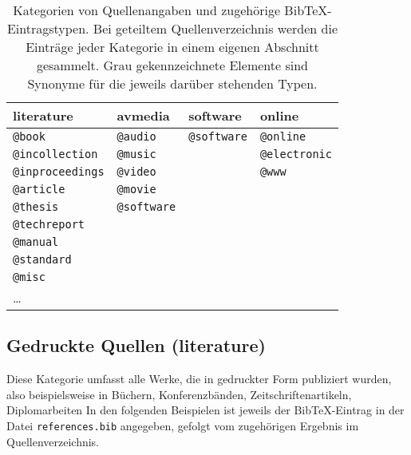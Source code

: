 \begin{table}
\caption{Kategorien von Quellenangaben und zugehörige BibTeX-Eintragstypen.
Bei geteiltem Quellenverzeichnis werden die Einträge jeder Kategorie in einem
eigenen Abschnitt gesammelt.
Grau gekennzeichnete Elemente sind Synonyme für die jeweils darüber stehenden Typen.}
\label{tab:BibKategorien}
\centering
{}
\setlength{\tabcolsep}{4mm}
\begin{tabular}{llll}
	\textsf{literature} & \textsf{avmedia} & \textsf{software} & \textsf{online} \\
	\hline
	\texttt{@book}          & \texttt{@audio}                & \texttt{@software} & \texttt{@online} \\
	\texttt{@incollection}  & \texttt{\color{midgray}@music} & & \texttt{\color{midgray}@electronic} \\
	\texttt{@inproceedings} & \texttt{@video}                & & \texttt{\color{midgray}@www} \\
	\texttt{@article}       & \texttt{@movie}                & &  \\
	\texttt{@thesis}        & \texttt{@software}             & &  \\
	\texttt{@techreport}    &  & &  \\
	\texttt{@manual}        &  & &  \\
	\texttt{@standard}        &  & &  \\
	\texttt{@misc}          &  & &  \\
	\ldots                  &  & &  \\
	\hline
\end{tabular}
\end{table}


\subsection{Gedruckte Quellen (\textsf{literature})}
\label{sec:KategorieLiterature}

Diese Kategorie umfasst alle Werke, die in gedruckter Form publiziert wurden,
also beispielsweise in Büchern, Konferenzbänden, Zeitschriftenartikeln, Diplomarbeiten \usw
In den folgenden Beispielen ist jeweils der BibTeX-Eintrag in der Datei \nolinkurl{references.bib}
angegeben, gefolgt vom zugehörigen Ergebnis im Quellenverzeichnis.


